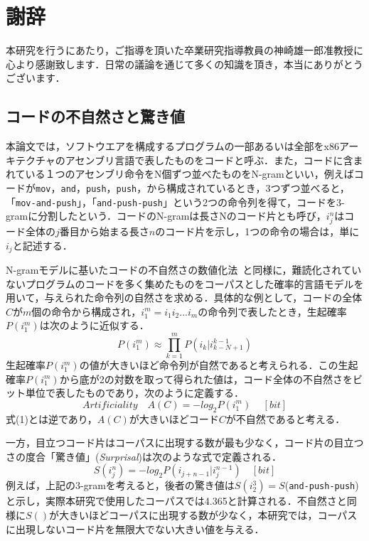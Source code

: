 \documentclass[12pt]{jarticle}
\begin{document}
\newpage
\section*{謝辞}

本研究を行うにあたり，ご指導を頂いた卒業研究指導教員の神崎雄一郎准教授に心より感謝致します．日常の議論を通じて多くの知識を頂き，本当にありがとうございます．


\newpage

\begin{appendices}
\section{コードの不自然さと驚き値}  \label{appendix:artAndsurp}
本論文では，ソフトウエアを構成するプログラムの一部あるいは全部をx86アーキテクチャのアセンブリ言語で表したものをコードと呼ぶ．また，コードに含まれている１つのアセンブリ命令をN個ずつ並べたものをN-gramといい，例えばコードが\texttt{mov}，\texttt{and}，\texttt{push}，\texttt{push}，から構成されているとき，3つずつ並べると，「\texttt{mov-and-push}」，「\texttt{and-push-push}」という2つの命令列を得て，コードを3-gramに分割したという．コードのN-gramは長さNのコード片とも呼び，$i_j^n$はコード全体の$j$番目から始まる長さ$n$のコード片を示し，1つの命令の場合は，単に$i_j$と記述する．

N-gramモデルに基いたコードの不自然さの数値化法~\cite{code-art}と同様に，難読化されていないプログラムのコードを多く集めたものをコーパスとした確率的言語モデルを用いて，与えられた命令列の自然さを求める．具体的な例として，コードの全体$C$が$m$個の命令から構成され，$i_1^m=i_1i_2...i_m$の命令列で表したとき，生起確率$P(i_1^m)$は次のように近似する．
\begin{equation}
  P(i_1^m)\approx\prod_{k=1}^m P(i_k|i_{k-N+1}^{k-1})
\end{equation}
生起確率$P(i_1^m)$の値が大きいほど命令列が自然であると考えられる．この生起確率$P(i_1^m)$から底が2の対数を取って得られた値は，コード全体の不自然さをビット単位で表したものであり，次のように定義する．
\begin{equation}
  Artificiality\quad A(C)=-log_2P(i_1^m)\,\quad[bit]
\end{equation}
式(1)とは逆であり，$A(C)$が大きいほどコード$C$が不自然であると考える．

一方，目立つコード片はコーパスに出現する数が最も少なく，コード片の目立つさの度合「驚き値」(\textit{Surprisal})は次のような式で定義される．
\begin{equation}
  S(i_j^n)=-log_2P(i_{j+n-1}|i_j^{n-1})\quad[bit]
\end{equation}
例えば，上記の3-gramを考えると，後者の驚き値は$S(i_2^3)=S$(\texttt{and-push-push})と示し，実際本研究で使用したコーパスでは4.365と計算される．不自然さと同様に$S()$が大きいほどコーパスに出現する数が少なく，本研究では，コーパスに出現しないコード片を無限大でない大きい値を与える．



\end{appendices}
\end{document}
